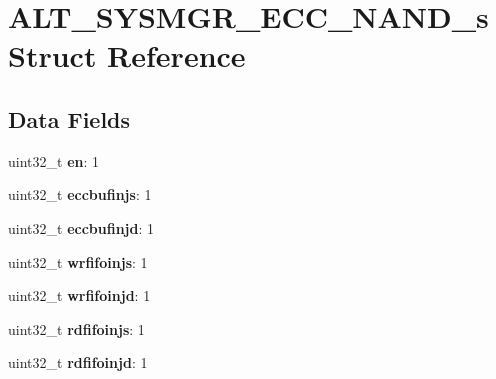 \hypertarget{structALT__SYSMGR__ECC__NAND__s}{}\section{A\+L\+T\+\_\+\+S\+Y\+S\+M\+G\+R\+\_\+\+E\+C\+C\+\_\+\+N\+A\+N\+D\+\_\+s Struct Reference}
\label{structALT__SYSMGR__ECC__NAND__s}
\subsection*{Data Fields}
\begin{DoxyCompactItemize}
\item 
\mbox{\label{structALT__SYSMGR__ECC__NAND__s_ab9814f75694c304f94736aa5e8018d13}} 
uint32\+\_\+t {\bfseries en}\+: 1
\item 
\mbox{\label{structALT__SYSMGR__ECC__NAND__s_a6df509e59856543c3680f58cad2c56f4}} 
uint32\+\_\+t {\bfseries eccbufinjs}\+: 1
\item 
\mbox{\label{structALT__SYSMGR__ECC__NAND__s_a9362507836c6dc26c54ddba9c9e094da}} 
uint32\+\_\+t {\bfseries eccbufinjd}\+: 1
\item 
\mbox{\label{structALT__SYSMGR__ECC__NAND__s_a586c97ab7df7811e4807ee6bcf0088fe}} 
uint32\+\_\+t {\bfseries wrfifoinjs}\+: 1
\item 
\mbox{\label{structALT__SYSMGR__ECC__NAND__s_a0018b618d1d5af510d7a828c7a35423f}} 
uint32\+\_\+t {\bfseries wrfifoinjd}\+: 1
\item 
\mbox{\label{structALT__SYSMGR__ECC__NAND__s_a02ab8fc0ec6f17264bc01b7f7396201e}} 
uint32\+\_\+t {\bfseries rdfifoinjs}\+: 1
\item 
\mbox{\label{structALT__SYSMGR__ECC__NAND__s_a2a309a7b5c656620787859125a545551}} 
uint32\+\_\+t {\bfseries rdfifoinjd}\+: 1
\item 
\mbox{\label{structALT__SYSMGR__ECC__NAND__s_af2e30f17326de5e3a861613d5f6f727f}} 

\end{DoxyCompactItemize}
